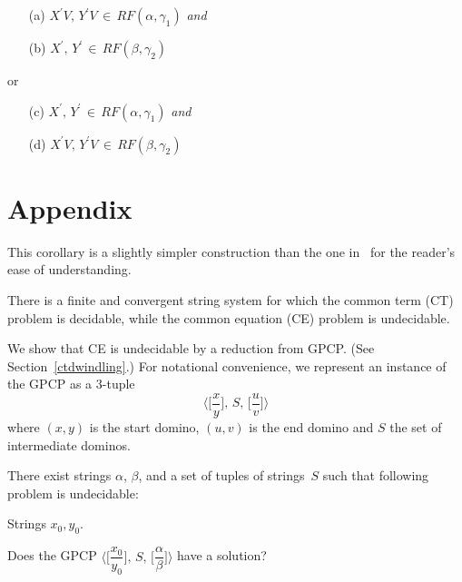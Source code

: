 \documentclass{lmcs} %
\theoremstyle{plain}\newtheorem{satz}[thm]{Satz} %
\begin{document}
\begin{appendices}
\begin{lem}{\label{CEOneMappingMonadicLemma4}}
\begin{enumerate}
\begin{itemize}
  \item[(a)] $X^{\prime} V, \, Y^{\prime} V \, \in \, RF(\alpha, \gamma_1^{}) $ \emph{and}

  \item[(b)] $X^{\prime} , \, Y^{\prime} \, \in \, RF(\beta, \gamma_2^{})$
  
\end{itemize} or \begin{itemize}

  \item[(c)] $X^{\prime} , \, Y^{\prime} \, \in \, RF(\alpha, \gamma_1^{})$ \emph{and}

  \item[(d)] $X^{\prime} V, \, Y^{\prime} V \, \in \, RF(\beta, \gamma_2^{}) $

\end{itemize}

\end{enumerate}

\end{lem}


\section{Appendix}\label{CTdecidableCEnot}
This corollary is a slightly simpler construction than the one
in~\cite{NarendranOtto97} for the reader's ease of understanding.

\begin{cor}
There is a finite and convergent string system for which the common
term (CT) problem is decidable, while the common equation (CE) problem
is undecidable.
\end{cor}

We show that CE is undecidable by a reduction from GPCP. (See Section~\ref{ctdwindling}.)
For notational convenience, we represent an instance of the GPCP as a 3-tuple
\begin{equation*}
\Bigg \langle \bigg[ \dfrac{x}{y} \bigg], \, S, \, \bigg[ \dfrac{u}{v} \bigg] \Bigg \rangle
\end{equation*}
where $(x, y)$ is the start domino, $(u, v)$ is the end domino and
$S$ the set of intermediate dominos.

\begin{thm}
There exist strings $\alpha$, $\beta$, and a set of tuples of
strings~$S$ such that following problem is undecidable:

\begin{description}[align=left]
\item[Input] Strings $x_0, y_0$.
\item[Question] Does the GPCP $\Bigg \langle \bigg[ \dfrac{x_0}{y_0} \bigg], \, S, \, \bigg[ \dfrac{\alpha}{\beta} \bigg] \Bigg \rangle$ have a solution?
\end{description}
\end{thm}


\end{appendices}
\end{document}

